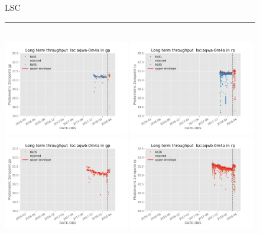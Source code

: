 \documentclass[draft]{spieman}
\begin{document}
\begin{figure}
\centering 
LSC \\ 
\rule{\textwidth}{0.4pt} \\
\includegraphics[width=0.49\textwidth]{images/photzptrend-lsc-aqwa-0m4a-gp.png} \hspace*{\fill}
\includegraphics[width=0.49\textwidth]{images/photzptrend-lsc-aqwa-0m4a-rp.png} \\
\includegraphics[width=0.49\textwidth]{images/photzptrend-lsc-aqwb-0m4a-gp.png} \hspace*{\fill}
\includegraphics[width=0.49\textwidth]{images/photzptrend-lsc-aqwb-0m4a-rp.png} \\

\end{figure}
\end{document}
